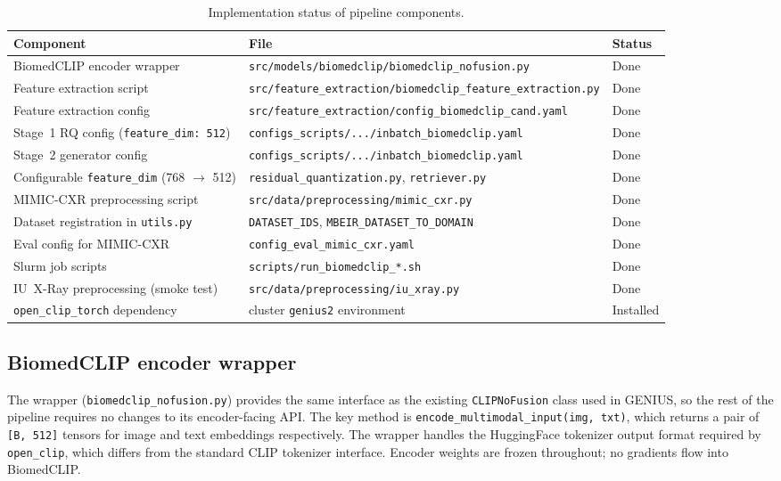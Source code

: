 \documentclass[11pt,a4paper]{article}
\begin{document}
\begin{table}[h]
\centering
\small
\caption{Implementation status of pipeline components.}
\label{tab:impl}
\begin{tabular}{@{}lll@{}}
\toprule
\textbf{Component} & \textbf{File} & \textbf{Status} \\
\midrule
BiomedCLIP encoder wrapper & \texttt{src/models/biomedclip/biomedclip\_nofusion.py} & Done \\
Feature extraction script & \texttt{src/feature\_extraction/biomedclip\_feature\_extraction.py} & Done \\
Feature extraction config & \texttt{src/feature\_extraction/config\_biomedclip\_cand.yaml} & Done \\
Stage~1 RQ config (\texttt{feature\_dim: 512}) & \texttt{configs\_scripts/.../inbatch\_biomedclip.yaml} & Done \\
Stage~2 generator config & \texttt{configs\_scripts/.../inbatch\_biomedclip.yaml} & Done \\
Configurable \texttt{feature\_dim} (768 $\to$ 512) & \texttt{residual\_quantization.py}, \texttt{retriever.py} & Done \\
MIMIC-CXR preprocessing script & \texttt{src/data/preprocessing/mimic\_cxr.py} & Done \\
Dataset registration in \texttt{utils.py} & \texttt{DATASET\_IDS}, \texttt{MBEIR\_DATASET\_TO\_DOMAIN} & Done \\
Eval config for MIMIC-CXR & \texttt{config\_eval\_mimic\_cxr.yaml} & Done \\
Slurm job scripts & \texttt{scripts/run\_biomedclip\_*.sh} & Done \\
IU~X-Ray preprocessing (smoke test) & \texttt{src/data/preprocessing/iu\_xray.py} & Done \\
\texttt{open\_clip\_torch} dependency & cluster \texttt{genius2} environment & Installed \\
\bottomrule
\end{tabular}
\end{table}

\subsection{BiomedCLIP encoder wrapper}

The wrapper (\texttt{biomedclip\_nofusion.py}) provides the same interface as
the existing \texttt{CLIPNoFusion} class used in GENIUS, so the rest of the
pipeline requires no changes to its encoder-facing API.
The key method is \texttt{encode\_multimodal\_input(img, txt)}, which returns a
pair of \texttt{[B, 512]} tensors for image and text embeddings respectively.
The wrapper handles the HuggingFace tokenizer output format required by
\texttt{open\_clip}, which differs from the standard CLIP tokenizer interface.
Encoder weights are frozen throughout; no gradients flow into BiomedCLIP.
\end{document}
